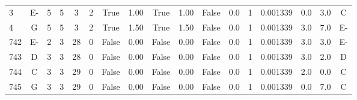 \begin{table}[H]
\begin{tabular}{|lcccccccccccccccc|}
   3   & E-                      & 5                         & 5                         & 3       & 2    & True    & 1.00                           & True                      & 1.00                             & False                    & 0.0                              & 1     & 0.001339                   & 0.0                         & 3.0                         & C                          \\
   4   & G                       & 5                         & 5                         & 3       & 2    & True    & 1.50                           & True                      & 1.50                             & False                    & 0.0                              & 1     & 0.001339                   & 3.0                         & 7.0                         & E-                         \\
   742 & E-                      & 2                         & 3                         & 28      & 0    & False   & 0.00                           & False                     & 0.00                             & False                    & 0.0                              & 1     & 0.001339                   & 3.0                         & 3.0                         & E-                         \\
   743 & D                       & 3                         & 3                         & 28      & 0    & False   & 0.00                           & False                     & 0.00                             & False                    & 0.0                              & 1     & 0.001339                   & 3.0                         & 2.0                         & D                          \\
   744 & C                       & 3                         & 3                         & 29      & 0    & False   & 0.00                           & False                     & 0.00                             & False                    & 0.0                              & 1     & 0.001339                   & 2.0                         & 0.0                         & C                          \\
   745 & G                       & 3                         & 3                         & 29      & 0    & False   & 0.00                           & False                     & 0.00                             & False                    & 0.0                              & 1     & 0.001339                   & 0.0                         & 7.0                         & C                          \\

\end{tabular}
\end{table}
